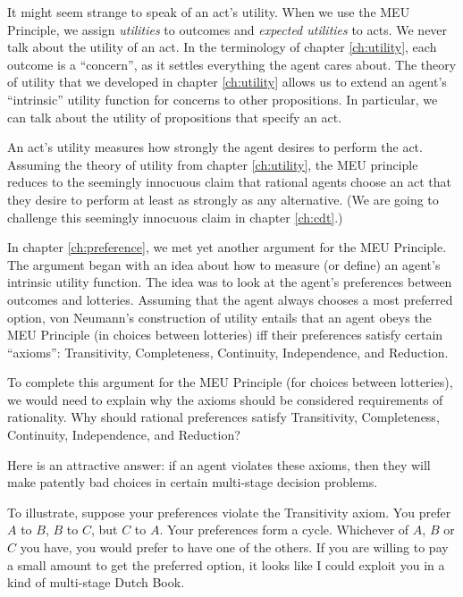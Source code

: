 It might seem strange to speak of an act's utility. When we use the MEU
Principle, we assign \emph{utilities} to outcomes and \emph{expected utilities}
to acts. We never talk about the utility of an act. In the terminology of
chapter \ref{ch:utility}, each outcome is a ``concern'', as it settles
everything the agent cares about. The theory of utility that we developed in
chapter \ref{ch:utility} allows us to extend an agent's ``intrinsic'' utility
function for concerns to other propositions. In particular, we can talk about
the utility of propositions that specify an act.

An act's utility measures how strongly the agent desires to perform the act.
Assuming the theory of utility from chapter \ref{ch:utility}, the MEU principle
reduces to the seemingly innocuous claim that rational agents choose an act that
they desire to perform at least as strongly as any alternative. (We are going to
challenge this seemingly innocuous claim in chapter \ref{ch:cdt}.)

In chapter \ref{ch:preference}, we met yet another argument for the MEU
Principle. The argument began with an idea about how to measure (or define) an
agent's intrinsic utility function. The idea was to look at the agent's
preferences between outcomes and lotteries. Assuming that the agent always
chooses a most preferred option, von Neumann's construction of utility entails
that an agent obeys the MEU Principle (in choices between lotteries) iff their
preferences satisfy certain ``axioms'': Transitivity, Completeness, Continuity,
Independence, and Reduction.


To complete this argument for the MEU Principle (for choices between lotteries),
we would need to explain why the axioms should be considered requirements of
rationality. Why should rational preferences satisfy Transitivity, Completeness,
Continuity, Independence, and Reduction?

Here is an attractive answer: if an agent violates these axioms, then they will
make patently bad choices in certain multi-stage decision problems.

To illustrate, suppose your preferences violate the Transitivity axiom. You
prefer $A$ to $B$, $B$ to $C$, but $C$ to $A$. Your preferences form a cycle.
Whichever of $A$, $B$ or $C$ you have, you would prefer to have one of the
others. If you are willing to pay a small amount to get the preferred option, it
looks like I could exploit you in a kind of multi-stage Dutch Book.


